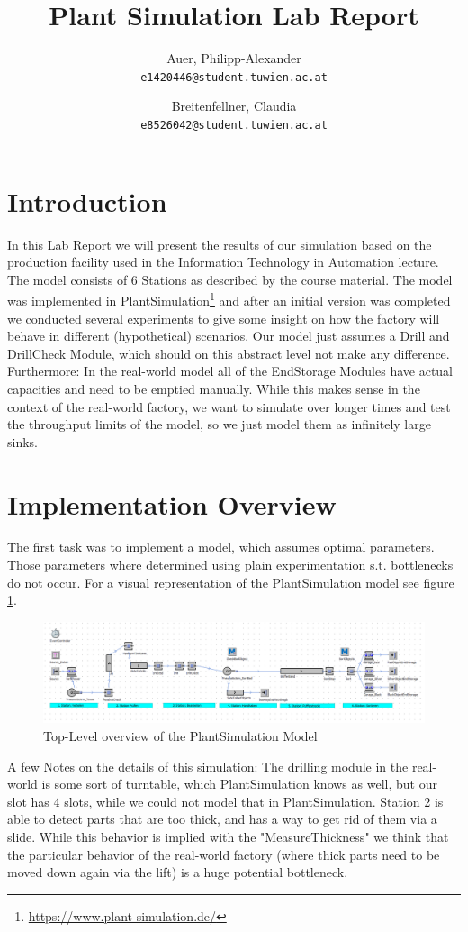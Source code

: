 \documentclass{report}
\begin{document}
\title{Plant Simulation Lab Report}
\author{
	Auer, Philipp-Alexander\\
	\texttt{e1420446@student.tuwien.ac.at}
	\and
	Breitenfellner, Claudia\\
	\texttt{e8526042@student.tuwien.ac.at}
}

\maketitle
\tableofcontents
\pagebreak
\section{Introduction}
In this Lab Report we will present the results of our simulation based on the production facility used in the Information Technology in Automation lecture. The model consists of 6 Stations as described by the course material. The model was implemented in PlantSimulation\footnote{\url{https://www.plant-simulation.de/}} and after an initial version was completed we conducted several experiments to give some insight on how the factory will behave in different (hypothetical) scenarios.
Our model just assumes a Drill and DrillCheck Module, which should on this abstract level not make any difference. 
Furthermore: In the real-world model all of the EndStorage Modules have actual capacities and need to be emptied manually. While this makes sense in the context of the real-world factory, we want to simulate over longer times and test the throughput limits of the model, so we just model them as infinitely large sinks.
\section{Implementation Overview}
The first task was to implement a model, which assumes optimal parameters. Those parameters where determined using plain experimentation s.t. bottlenecks do not occur. For a visual representation of the PlantSimulation model see figure \ref{fig:overview}.
\begin{figure}[h!]
	\includegraphics[width=\textwidth]{figures/overview.png}
	\caption{Top-Level overview of the PlantSimulation Model}
	\label{fig:overview}
\end{figure}
A few Notes on the details of this simulation: The drilling module in the real-world is some sort of turntable, which PlantSimulation knows as well, but our slot has 4 slots, while we could not model that in PlantSimulation. Station 2 is able to detect parts that are too thick, and has a way to get rid of them via a slide. While this behavior is implied with the "MeasureThickness" we think that the particular behavior of the real-world factory (where thick parts need to be moved down again via the lift) is a huge potential bottleneck.
\end{document}
